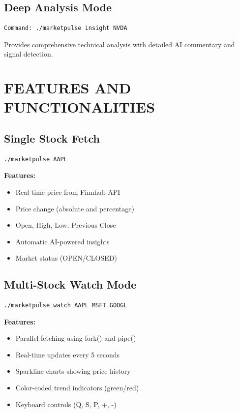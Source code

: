 \documentclass[12pt,a4paper]{article}
\begin{document}
\subsection{Deep Analysis Mode}

\begin{lstlisting}
Command: ./marketpulse insight NVDA
\end{lstlisting}

Provides comprehensive technical analysis with detailed AI commentary and signal detection.

\newpage

\section{FEATURES AND FUNCTIONALITIES}

\subsection{Single Stock Fetch}

\begin{lstlisting}
./marketpulse AAPL
\end{lstlisting}

\textbf{Features:}
\begin{itemize}[itemsep=0.3em]
    \item Real-time price from Finnhub API
    \item Price change (absolute and percentage)
    \item Open, High, Low, Previous Close
    \item Automatic AI-powered insights
    \item Market status (OPEN/CLOSED)
\end{itemize}

\subsection{Multi-Stock Watch Mode}

\begin{lstlisting}
./marketpulse watch AAPL MSFT GOOGL
\end{lstlisting}

\textbf{Features:}
\begin{itemize}[itemsep=0.3em]
    \item Parallel fetching using fork() and pipe()
    \item Real-time updates every 5 seconds
    \item Sparkline charts showing price history
    \item Color-coded trend indicators (green/red)
    \item Keyboard controls (Q, S, P, +, -)
\end{itemize}
\end{document}

